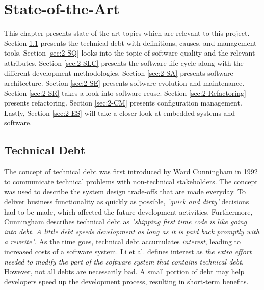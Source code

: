 






\chapter{State-of-the-Art}
This chapter presents state-of-the-art topics which are relevant to this project. Section \ref{sec:2-TD} presents the technical debt with definitions, causes, and management tools. Section \ref{sec:2-SQ} looks into the topic of software quality and the relevant attributes. Section \ref{sec:2-SLC} presents the software life cycle along with the different development methodologies. Section \ref{sec:2-SA} presents software architecture. Section \ref{sec:2-SE} presents software evolution and maintenance.
Section \ref{sec:2-SR} takes a look into software reuse. Section \ref{sec:2-Refactoring} presents refactoring. Section \ref{sec:2-CM} presents configuration management. Lastly, Section \ref{sec:2-ES} will take a closer look at embedded systems and software.


\section{Technical Debt}
\label{sec:2-TD}
The concept of technical debt was first introduced by Ward Cunningham in 1992 to communicate technical problems with non-technical stakeholders\cite{p29-cunningham}. The concept was used to describe the system design trade-offs that are made everyday. To deliver business functionality as quickly as possible, \textit{'quick and dirty'} decisions had to be made, which affected the future development activities. Furthermore, Cunningham describes technical debt as \textit{"shipping first time code is like going into debt. A little debt speeds development as long as it is paid back promptly with a rewrite"}. As the time goes, technical debt accumulates \textit{interest}, leading to increased costs of a software system\cite{p31-guo,p35-klinger}. Li et al.\cite{li2015systematic} defines interest as \textit{the extra effort needed to modify the part of the software system that contains technical debt}. However, not all debts are necessarily bad. A small portion of debt may help developers speed up the development process, resulting in short-term benefits\cite{p31-guo}. 

